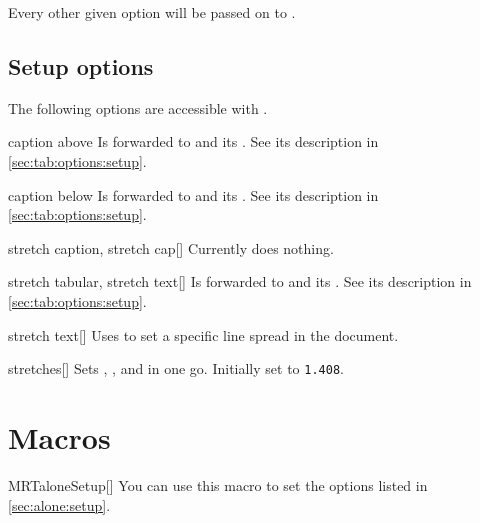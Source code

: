 Every other given option will be passed on to .
\subsection{Setup options}\label{sec:alone:setup}%
The following options are accessible with .
\begin{describeopt}{caption above}
  Is forwarded to  and its . See its description in
  \autoref{sec:tab:options:setup}.
\end{describeopt}
\begin{describeopt}{caption below}
  Is forwarded to  and its . See its description in
  \autoref{sec:tab:options:setup}.
\end{describeopt}
\begin{describeopt}{stretch caption, stretch cap}[]
  Currently does nothing.
\end{describeopt}
\begin{describeopt}{stretch tabular, stretch text}[]
  Is forwarded to  and its . See its description in
  \autoref{sec:tab:options:setup}.
\end{describeopt}
\begin{describeopt}{stretch text}[]
  Uses  to set a specific line spread in the document.
\end{describeopt}
\begin{describeopt}{stretches}[]
  Sets , , and  in one go.
  Initially set to \texttt{1.408}.
\end{describeopt}

\section{Macros}%
\begin{describemacro}{MRTaloneSetup}[]%
  You can use this macro to set the options listed in \autoref{sec:alone:setup}.
\end{describemacro}%

